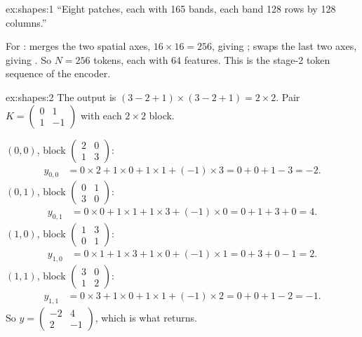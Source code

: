 
\begin{solution}{ex:shapes:1}
``Eight patches, each with 165 bands, each band 128 rows by 128 columns.''

For :  merges the two spatial axes,
$16\times16 = 256$, giving ;  swaps the last two axes,
giving . So $N = 256$ tokens, each with $64$ features. This is the stage-2 token
sequence of the encoder.
\end{solution}

\begin{solution}{ex:shapes:2}
The output is $(3-2+1)\times(3-2+1) = 2\times2$. Pair $K = \begin{pmatrix}0&1\\1&-1\end{pmatrix}$ with
each $2\times2$ block.

$(0,0)$, block $\begin{pmatrix}2&0\\1&3\end{pmatrix}$:
\begin{align*}
y_{0,0} &= 0\times2 + 1\times0 + 1\times1 + (-1)\times3 = 0 + 0 + 1 - 3 = -2.
\end{align*}
$(0,1)$, block $\begin{pmatrix}0&1\\3&0\end{pmatrix}$:
\begin{align*}
y_{0,1} &= 0\times0 + 1\times1 + 1\times3 + (-1)\times0 = 0 + 1 + 3 + 0 = 4.
\end{align*}
$(1,0)$, block $\begin{pmatrix}1&3\\0&1\end{pmatrix}$:
\begin{align*}
y_{1,0} &= 0\times1 + 1\times3 + 1\times0 + (-1)\times1 = 0 + 3 + 0 - 1 = 2.
\end{align*}
$(1,1)$, block $\begin{pmatrix}3&0\\1&2\end{pmatrix}$:
\begin{align*}
y_{1,1} &= 0\times3 + 1\times0 + 1\times1 + (-1)\times2 = 0 + 0 + 1 - 2 = -1.
\end{align*}
So $y = \begin{pmatrix}-2&4\\2&-1\end{pmatrix}$, which is what  returns.
\end{solution}

